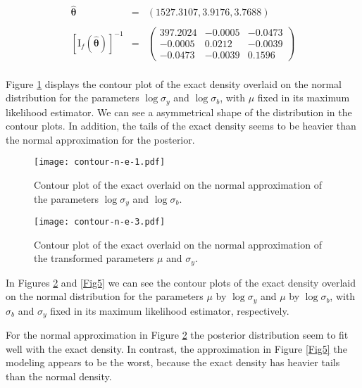 \documentclass{asaproc}
\begin{document}
\begin{equation}
\begin{array}{rclll}
\boldsymbol{\hat{\theta}} & = & (1527.3107, 3.9176, 3.7688) \\ \\

\left[\mbox{I}_f(\boldsymbol{\hat{\theta}})\right]^{-1} & = & \left(
    \begin{array}{ccc}
      397.2024 & -0.0005 & -0.0473 \\
 	  -0.0005  & 0.0212 & -0.0039 \\
 	 -0.0473 & -0.0039 &  0.1596
    \end{array}
        \right) \\
\end{array}
\label{eq2}
\end{equation}

Figure \ref{Fig3} displays the contour plot of the exact density overlaid on the normal distribution for the parameters $\log\sigma_y$ and $\log\sigma_b$, with $\mu$ fixed in its maximum likelihood estimator. We can see a asymmetrical shape of the distribution in the contour plots. In addition, the tails of the exact density seems to be heavier than the normal approximation for the posterior.

\begin{figure}[H]
\centering
\caption{Contour plot of the exact overlaid on the normal approximation of the parameters $\log\sigma_y$ and $\log\sigma_b$.}
\label{Fig3}
\texttt{[image: contour-n-e-1.pdf]}
\end{figure}

\begin{figure}[H]
\centering
\caption{Contour plot of the exact overlaid on the normal approximation of the transformed parameters $\mu$ and $\sigma_y$.}
\label{Fig4}
\texttt{[image: contour-n-e-3.pdf]}
\end{figure}

In Figures \ref{Fig4} and \ref{Fig5} we can see the contour plots of the exact density overlaid on the normal distribution for the parameters $\mu$ by $\log\sigma_y$ and $\mu$ by $\log\sigma_b$, with $\sigma_b$ and $\sigma_y$ fixed in its maximum likelihood estimator, respectively.

For the normal approximation in Figure \ref{Fig4} the posterior distribution seem to fit well with the exact density. In contrast, the approximation in Figure \ref{Fig5} the modeling appears to be the worst, because the exact density has heavier tails than the normal density.
\end{document}

